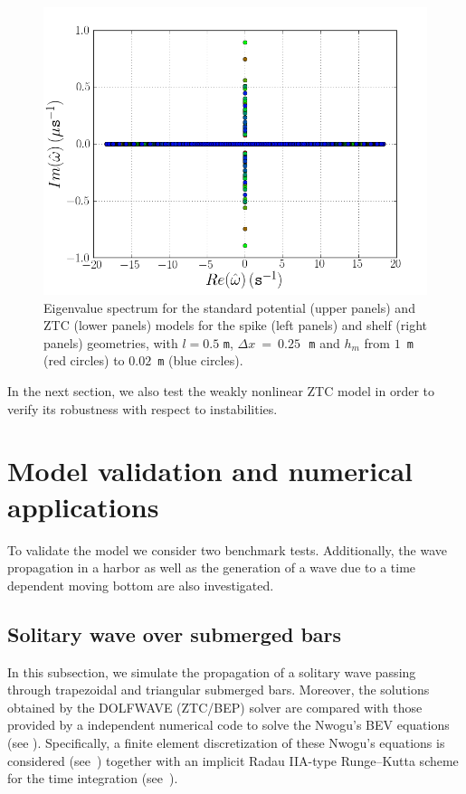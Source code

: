 \begin{figure}
  \includegraphics[width=\twofigs]{chapters/lopes/png/L0_5_dx_0_25_hm_shelf_spectrum_Zhao.png}
  \caption{Eigenvalue spectrum for the standard potential (upper
    panels) and ZTC (lower panels) models for the spike (left panels) and
    shelf (right panels) geometries, with $l=0.5$ {\tt m}, $\Delta
    x~=~0.25$\,~{\tt m} and $h_m$ from $1$~{\tt m} (red circles) to
    $0.02$~{\tt m} (blue circles).}
  \label{fig:lopes:spectrumhm3}
\end{figure}

In the next section, we also test the weakly nonlinear ZTC model in
order to verify its robustness with respect to instabilities.

\section{Model validation and numerical applications}
\label{sec:lopes:numericaltests}

To validate the model we consider two benchmark tests.  Additionally,
the wave propagation in a harbor as well as the generation of a wave
due to a time dependent moving bottom are also investigated.

\subsection{Solitary wave over  submerged bars}

In this subsection, we simulate the propagation of a solitary wave
passing through trapezoidal and triangular submerged bars.  Moreover,
the solutions obtained by the DOLFWAVE (ZTC/BEP) solver are compared
with those provided by a \fenics independent numerical code to solve
the Nwogu's BEV equations (see ).
Specifically, a finite element discretization of these Nwogu's
equations is considered (see~\citet{Walkley1999}) together with an
implicit Radau IIA-type Runge--Kutta scheme for the time integration
(see~\citet{HairerWanner1991b}).

